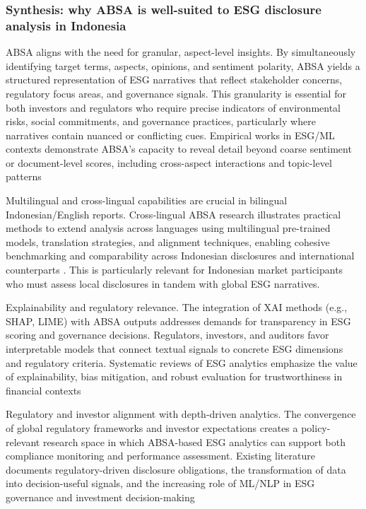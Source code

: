 \subsubsection{Synthesis: why ABSA is well-suited to ESG disclosure analysis in Indonesia}
ABSA aligns with the need for granular, aspect-level insights. By simultaneously identifying target terms, aspects, opinions, and sentiment polarity, ABSA yields a structured representation of ESG narratives that reflect stakeholder concerns, regulatory focus areas, and governance signals. This granularity is essential for both investors and regulators who require precise indicators of environmental risks, social commitments, and governance practices, particularly where narratives contain nuanced or conflicting cues. Empirical works in ESG/ML contexts demonstrate ABSA’s capacity to reveal detail beyond coarse sentiment or document-level scores, including cross-aspect interactions and topic-level patterns \cite{10.3390/math12193119,10.1002/csr.70089,10.1111/eufm.12509,10.1109/access.2023.3348342,10.2139/ssrn.3738629}

Multilingual and cross-lingual capabilities are crucial in bilingual Indonesian/English reports. Cross-lingual ABSA research illustrates practical methods to extend analysis across languages using multilingual pre-trained models, translation strategies, and alignment techniques, enabling cohesive benchmarking and comparability across Indonesian disclosures and international counterparts \cite{10.1016/j.inffus.2025.103073,10.1111/eufm.12509,10.48550/arxiv.2511.00024}. This is particularly relevant for Indonesian market participants who must assess local disclosures in tandem with global ESG narratives.

Explainability and regulatory relevance. The integration of XAI methods (e.g., SHAP, LIME) with ABSA outputs addresses demands for transparency in ESG scoring and governance decisions. Regulators, investors, and auditors favor interpretable models that connect textual signals to concrete ESG dimensions and regulatory criteria. Systematic reviews of ESG analytics emphasize the value of explainability, bias mitigation, and robust evaluation for trustworthiness in financial contexts \cite{10.1002/csr.70089,10.2139/ssrn.3738629,10.1108/mf-01-2023-0020}

Regulatory and investor alignment with depth-driven analytics. The convergence of global regulatory frameworks and investor expectations creates a policy-relevant research space in which ABSA-based ESG analytics can support both compliance monitoring and performance assessment. Existing literature documents regulatory-driven disclosure obligations, the transformation of data into decision-useful signals, and the increasing role of ML/NLP in ESG governance and investment decision-making \cite{10.1007/s40804-021-00233-z,10.69593/ajbais.v4i04.130,10.2139/ssrn.3738629,10.1108/mf-01-2023-0020}

